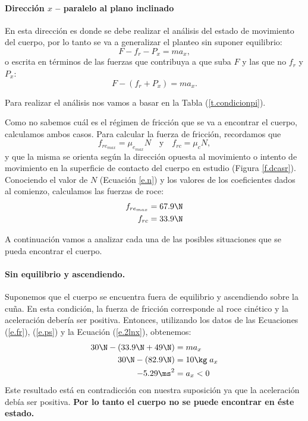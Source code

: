\paragraph{Dirección $x$ -- paralelo al plano inclinado\\}

En esta dirección es donde se debe realizar el análisis del estado de movimiento
del cuerpo, por lo tanto se va a generalizar el planteo sin suponer equilibrio:
\begin{equation*}
  F - f_r - P_x = m a_x,
\end{equation*}
o escrita en términos de las fuerzas que contribuya a que suba $F$ y las que no
$f_r$ y $P_x$:
\begin{equation} \label{e.2lnx}
  F - (f_r + P_x) = m a_x.
\end{equation}

Para realizar el análisis nos vamos a basar en la Tabla (\ref{t.condicionpi}).

Como no sabemos cuál es el régimen de fricción que se va a encontrar el cuerpo,
calculamos ambos casos. Para calcular la fuerza de fricción, recordamos que
\begin{equation}
  f_{re_{max}} = \mu_{e_{max}} N \quad \mathrm{y} \quad f_{rc}=\mu_{c} N,
\end{equation}
y que la misma se orienta según la dirección opuesta al movimiento o intento de
movimiento en la superficie de contacto del cuerpo en estudio (Figura
\ref{f.dcasr}). Conociendo el valor de $N$ (Ecuación \ref{e.n}) y los valores de los
coeficientes dados al comienzo, calculamos las fuerzas de roce:
\begin{align} \label{e.fr}
  f_{re_{max}} &= 67.9\N \\
  f_{rc} &= 33.9\N \nonumber
\end{align}

A continuación vamos a analizar cada una de las posibles situaciones que se
pueda encontrar el cuerpo.

\paragraph{Sin equilibrio y ascendiendo.}
Suponemos que el cuerpo se encuentra fuera de equilibrio y ascendiendo sobre la
cuña. En esta condición, la fuerza de fricción corresponde al roce cinético y la
aceleración debería ser positiva.
Entonces, utilizando los datos de las Ecuaciones (\ref{e.fr}), (\ref{e.ps}) y la
Ecuación (\ref{e.2lnx}), obtenemos:
\begin{align*}
  30\N - (33.9\N + 49\N) &= m a_x \\
  30\N - (82.9\N) & = 10\kg\; a_x \\
  -5.29\ms^2 & =  a_x < 0 
\end{align*}
Este resultado está en contradicción con nuestra suposición ya que la
aceleración debía ser positiva. {\bf Por lo tanto el cuerpo no se puede
encontrar en éste estado.}

